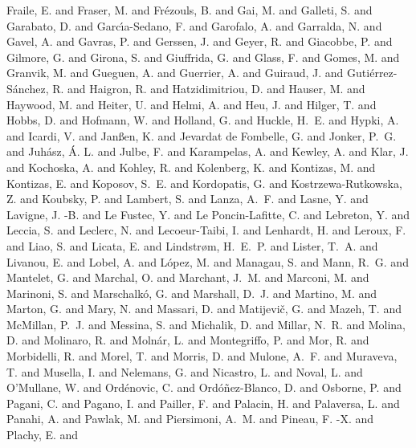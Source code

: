 \documentclass[a4paper,fleqn,usenatbib]{mnras}
\begin{document}
{{         {Fraile}, E. and {Fraser}, M. and {Fr{\'e}zouls}, B. and {Gai}, M. and
         {Galleti}, S. and {Garabato}, D. and {Garc{\'\i}a-Sedano}, F. and
         {Garofalo}, A. and {Garralda}, N. and {Gavel}, A. and {Gavras}, P. and
         {Gerssen}, J. and {Geyer}, R. and {Giacobbe}, P. and {Gilmore}, G. and
         {Girona}, S. and {Giuffrida}, G. and {Glass}, F. and {Gomes}, M. and
         {Granvik}, M. and {Gueguen}, A. and {Guerrier}, A. and {Guiraud}, J. and
         {Guti{\'e}rrez-S{\'a}nchez}, R. and {Haigron}, R. and
         {Hatzidimitriou}, D. and {Hauser}, M. and {Haywood}, M. and
         {Heiter}, U. and {Helmi}, A. and {Heu}, J. and {Hilger}, T. and
         {Hobbs}, D. and {Hofmann}, W. and {Holland}, G. and {Huckle}, H.~E. and
         {Hypki}, A. and {Icardi}, V. and {Jan{\ss}en}, K. and
         {Jevardat de Fombelle}, G. and {Jonker}, P.~G. and
         {Juh{\'a}sz}, {\'A}. L. and {Julbe}, F. and {Karampelas}, A. and
         {Kewley}, A. and {Klar}, J. and {Kochoska}, A. and {Kohley}, R. and
         {Kolenberg}, K. and {Kontizas}, M. and {Kontizas}, E. and
         {Koposov}, S.~E. and {Kordopatis}, G. and {Kostrzewa-Rutkowska}, Z. and
         {Koubsky}, P. and {Lambert}, S. and {Lanza}, A.~F. and {Lasne}, Y. and
         {Lavigne}, J. -B. and {Le Fustec}, Y. and {Le Poncin-Lafitte}, C. and
         {Lebreton}, Y. and {Leccia}, S. and {Leclerc}, N. and
         {Lecoeur-Taibi}, I. and {Lenhardt}, H. and {Leroux}, F. and {Liao}, S. and
         {Licata}, E. and {Lindstr{\o}m}, H.~E.~P. and {Lister}, T.~A. and
         {Livanou}, E. and {Lobel}, A. and {L{\'o}pez}, M. and {Managau}, S. and
         {Mann}, R.~G. and {Mantelet}, G. and {Marchal}, O. and
         {Marchant}, J.~M. and {Marconi}, M. and {Marinoni}, S. and
         {Marschalk{\'o}}, G. and {Marshall}, D.~J. and {Martino}, M. and
         {Marton}, G. and {Mary}, N. and {Massari}, D. and
         {Matijevi{\v{c}}}, G. and {Mazeh}, T. and {McMillan}, P.~J. and
         {Messina}, S. and {Michalik}, D. and {Millar}, N.~R. and {Molina}, D. and
         {Molinaro}, R. and {Moln{\'a}r}, L. and {Montegriffo}, P. and
         {Mor}, R. and {Morbidelli}, R. and {Morel}, T. and {Morris}, D. and
         {Mulone}, A.~F. and {Muraveva}, T. and {Musella}, I. and
         {Nelemans}, G. and {Nicastro}, L. and {Noval}, L. and {O'Mullane}, W. and
         {Ord{\'e}novic}, C. and {Ord{\'o}{\~n}ez-Blanco}, D. and {Osborne}, P. and
         {Pagani}, C. and {Pagano}, I. and {Pailler}, F. and {Palacin}, H. and
         {Palaversa}, L. and {Panahi}, A. and {Pawlak}, M. and
         {Piersimoni}, A.~M. and {Pineau}, F. -X. and {Plachy}, E. and
}}
\end{document}
